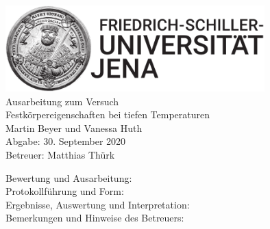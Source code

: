 \documentclass[parskip=half, a4paper,twoside,final]{article}
\begin{document}
\setlength{\marginparsep}{2em}
\renewcommand{\theequation}{\arabic{section}.\arabic{equation}}
\renewcommand{\thefigure}{\arabic{section}.\arabic{figure}}
\renewcommand{\thetable}{\arabic{section}.\arabic{table}}

\begin{center}
\thispagestyle{empty}
  \includegraphics[width=0.75\textwidth]{../UniJena_BildWortMarke_black.pdf}\\[4em]
  \Large
  Ausarbeitung zum Versuch\\[2em]
  \Huge
  Festkörpereigenschaften bei tiefen Temperaturen\\
  \vspace{2cm}
  \Large
  Martin Beyer und Vanessa Huth\\[2em]
  Abgabe: 30. September 2020\\[2em]
  Betreuer: Matthias Thürk\\[5em]
  \begin{flushleft}
  	Bewertung und Ausarbeitung:\\[2em]
		Protokollführung und Form:\\[1em]
		Ergebnisse, Auswertung und Interpretation:\\[1em]
		Bemerkungen und Hinweise des Betreuers:
  \end{flushleft}
\end{center}
\clearpage

\pagestyle{fancy}
\renewcommand{\headrulewidth}{0pt}
\renewcommand{\footrulewidth}{0.5pt}
\renewcommand{\sectionmark}[1]{\markright{#1}}
\fancyhead[RE,LO]{\rightmark}
\fancyfoot[LE,RO]{\bfseries\thepage}
\renewcommand{\headrulewidth}{0.5pt}
\renewcommand{\footrulewidth}{0.5pt}

\setcounter{equation}{0}
\setcounter{figure}{0}

\tableofcontents
\newpage
\end{document}
